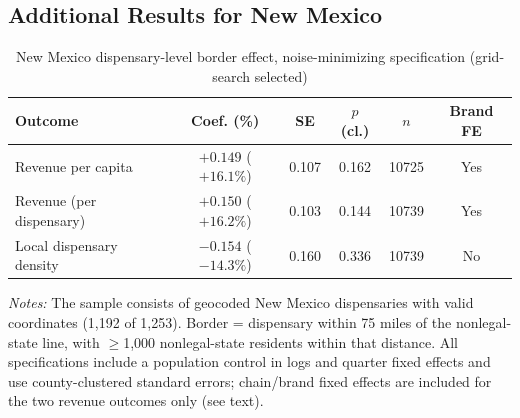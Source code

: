 \documentclass[english,12pt]{article}
\begin{document}
\begin{table}[htbp]
\centering\footnotesize

\caption{Main specification re-estimated at the town level: full zero-inclusive panel of 78 town-markets (Albuquerque excluded), inverse hyperbolic sine transformation, same controls as the ZIP-code main specification (no market-age control).}
\label{tab:townlevel}
\end{table}

\subsection{Additional Results for New Mexico}
\label{app:nm}

\begin{table}[htbp]
\centering\footnotesize

\caption{Summary statistics by exposure group, New Mexico ZIP-code panel, 2022Q2--2026Q2. Panel A: full ZIP-code panel (all 368 populated ZIP codes, zero-inclusive); Panel B: secondary conditional-on-activity sample (125 ZIP codes with at least one recorded dispensary). Revenue and store counts are ZIP-quarter means. Average dispensary age (in quarters since a storefront's own first active quarter) is computed over active dispensary-quarters only, so it is identical across the two panels: ZIP-quarters with no dispensary contribute no dispensary-age observations either way.}
\label{tab:sumstats_nm}
\end{table}

\begin{table}[htbp]
\centering
\caption{New Mexico dispensary-level border effect, noise-minimizing specification (grid-search selected)}
\label{tab:nm_dispensary_border_best}
\footnotesize
\begin{tabular}{lccccc}
\toprule
Outcome & Coef. (\%) & SE & $p$ (cl.) & $n$ & Brand FE \\
\midrule
Revenue per capita & $+0.149$ ($+16.1\%$) & 0.107 & 0.162 & 10725 & Yes \\
Revenue (per dispensary) & $+0.150$ ($+16.2\%$) & 0.103 & 0.144 & 10739 & Yes \\
Local dispensary density & $-0.154$ ($-14.3\%$) & 0.160 & 0.336 & 10739 & No \\
\bottomrule
\end{tabular}
\begin{minipage}{0.98\textwidth}
\vspace{0.3em}
\footnotesize
\textit{Notes:} The sample consists of geocoded New Mexico dispensaries with valid coordinates (1,192 of 1,253). Border =
dispensary within 75 miles of the nonlegal-state line, with $\geq$1,000 nonlegal-state residents within that
distance. All specifications include a population control in logs and quarter fixed effects and use county-clustered standard errors;
chain/brand fixed effects are included for the two revenue outcomes only (see text).
\end{minipage}
\end{table}
\end{document}
